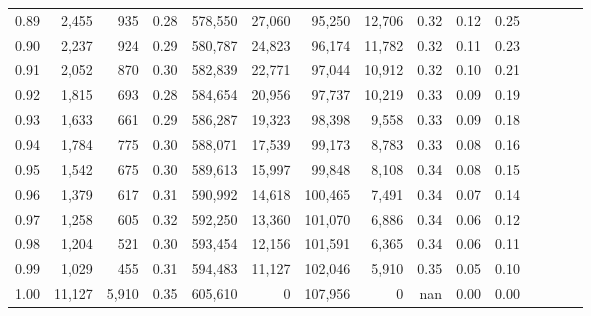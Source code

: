 \begin{tabular}{rrrcrrrrrrrrrrr}
0.89 &   2,455 &    935 &                                       0.28 &  578,550 &   27,060 &   95,250 &   12,706 &  0.32 &  0.12 &                         0.25 \\
0.90 &   2,237 &    924 &                                       0.29 &  580,787 &   24,823 &   96,174 &   11,782 &  0.32 &  0.11 &                         0.23 \\
0.91 &   2,052 &    870 &                                       0.30 &  582,839 &   22,771 &   97,044 &   10,912 &  0.32 &  0.10 &                         0.21 \\
0.92 &   1,815 &    693 &                                       0.28 &  584,654 &   20,956 &   97,737 &   10,219 &  0.33 &  0.09 &                         0.19 \\
0.93 &   1,633 &    661 &                                       0.29 &  586,287 &   19,323 &   98,398 &    9,558 &  0.33 &  0.09 &                         0.18 \\
0.94 &   1,784 &    775 &                                       0.30 &  588,071 &   17,539 &   99,173 &    8,783 &  0.33 &  0.08 &                         0.16 \\
0.95 &   1,542 &    675 &                                       0.30 &  589,613 &   15,997 &   99,848 &    8,108 &  0.34 &  0.08 &                         0.15 \\
0.96 &   1,379 &    617 &                                       0.31 &  590,992 &   14,618 &  100,465 &    7,491 &  0.34 &  0.07 &                         0.14 \\
0.97 &   1,258 &    605 &                                       0.32 &  592,250 &   13,360 &  101,070 &    6,886 &  0.34 &  0.06 &                         0.12 \\
0.98 &   1,204 &    521 &                                       0.30 &  593,454 &   12,156 &  101,591 &    6,365 &  0.34 &  0.06 &                         0.11 \\
0.99 &   1,029 &    455 &                                       0.31 &  594,483 &   11,127 &  102,046 &    5,910 &  0.35 &  0.05 &                         0.10 \\
1.00 &  11,127 &  5,910 &                                       0.35 &  605,610 &        0 &  107,956 &        0 &   nan &  0.00 &                         0.00 \\
\bottomrule
\end{tabular}
